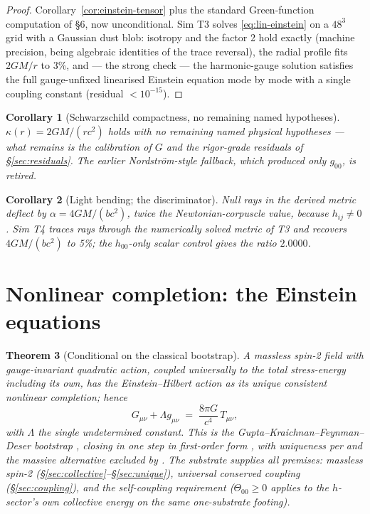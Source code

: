 \documentclass[12pt]{article}
\newtheorem{theorem}{Theorem}
\newtheorem{corollary}[theorem]{Corollary}
\theoremstyle{definition}
\theoremstyle{remark}
\newcommand{\Th}{\Theta}
\begin{document}
\begin{proof}
Corollary~\ref{cor:einstein-tensor} plus the standard Green-function computation of \citep{SmartKappa} \S6, now unconditional. Sim T3 solves \eqref{eq:lin-einstein} on a $48^3$ grid with a Gaussian dust blob: isotropy and the factor 2 hold exactly (machine precision, being algebraic identities of the trace reversal), the radial profile fits $2GM/r$ to 3\%, and --- the strong check --- the harmonic-gauge solution satisfies the full gauge-unfixed linearised Einstein equation mode by mode with a single coupling constant (residual $< 10^{-15}$).
\end{proof}

\begin{corollary}[Schwarzschild compactness, no remaining named hypotheses]\label{cor:kappa}
$\kappa(r) = 2GM/(rc^2)$ holds with no remaining named physical hypotheses --- what remains is the calibration of $G$ and the rigor-grade residuals of \S\ref{sec:residuals}. The earlier Nordstr\"om-style fallback, which produced only $g_{00}$, is retired.
\end{corollary}

\begin{corollary}[Light bending; the discriminator]\label{cor:bending}
Null rays in the derived metric deflect by $\alpha = 4GM/(bc^2)$, twice the Newtonian-corpuscle value, because $h_{ij} \neq 0$. Sim T4 traces rays through the numerically solved metric of T3 and recovers $4GM/(bc^2)$ to 5\%; the $h_{00}$-only scalar control gives the ratio $2.0000$.
\end{corollary}

\section{Nonlinear completion: the Einstein equations}\label{sec:bootstrap}

\begin{theorem}[Conditional on the classical bootstrap]\label{thm:einstein}
A massless spin-2 field with gauge-invariant quadratic action, coupled universally to the total stress-energy including its own, has the Einstein--Hilbert action as its unique consistent nonlinear completion; hence
\begin{equation}
G_{\mu\nu} + \Lambda g_{\mu\nu} \;=\; \frac{8\pi G}{c^4}\,T_{\mu\nu},
\end{equation}
with $\Lambda$ the single undetermined constant. This is the Gupta--Kraichnan--Feynman--Deser bootstrap \citep{Gupta1954, Kraichnan1955, Feynman1995, Deser1970}, closing in one step in first-order form \citep{Deser1970}, with uniqueness per \citep{Wald1986} and the massive alternative excluded by \citep{BoulwareDeser1975}. The substrate supplies all premises: massless spin-2 (\S\ref{sec:collective}--\S\ref{sec:unique}), universal conserved coupling (\S\ref{sec:coupling}), and the self-coupling requirement ($\Th_{00} \ge 0$ applies to the $h$-sector's own collective energy on the same one-substrate footing).
\end{theorem}
\end{document}
